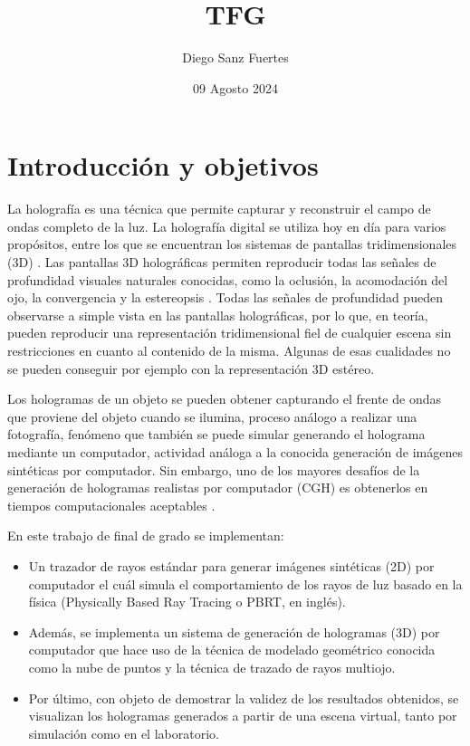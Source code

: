 \documentclass[10pt, a4paper]{article}
\title{TFG}
\author{Diego Sanz Fuertes}
\date{09 Agosto 2024}
\begin{document}
\maketitle
\titlepage
\tableofcontents
\newpage

\section{Introducción y objetivos}

La holografía es una técnica que permite capturar y reconstruir el campo de ondas completo de la luz. \cite{Goodman:2017} La holografía digital se utiliza hoy en día para varios propósitos, entre los que se encuentran los sistemas de pantallas tridimensionales (3D) \cite{Blinder:2019}. Las pantallas 3D holográficas permiten reproducir todas las señales de profundidad visuales naturales conocidas, como la oclusión, la acomodación del ojo, la convergencia y la estereopsis \cite{Blinder:2022}. Todas las señales de profundidad pueden observarse a simple vista en las pantallas holográficas, por lo que, en teoría, pueden reproducir una representación tridimensional fiel de cualquier escena sin restricciones en cuanto al contenido de la misma. Algunas de esas cualidades no se pueden conseguir por ejemplo con la representación 3D estéreo.

Los hologramas de un objeto se pueden obtener capturando el frente de ondas que proviene del objeto cuando se ilumina, proceso análogo a realizar una fotografía, fenómeno que también se puede simular generando el holograma mediante un computador, actividad análoga a la conocida generación de imágenes sintéticas por computador. Sin embargo, uno de los mayores desafíos de la generación de hologramas realistas por computador (CGH) es obtenerlos en tiempos computacionales aceptables \cite{Blinder:2019}.

En este trabajo de final de grado se implementan:
\begin{itemize}
    \item Un trazador de rayos estándar para generar imágenes sintéticas (2D) por computador el cuál simula el comportamiento de los rayos de luz basado en la física (Physically Based Ray Tracing o PBRT, en inglés).

    \item Además, se implementa un sistema de generación de hologramas (3D) por computador que hace uso de la técnica de modelado geométrico conocida como la nube de puntos y la técnica de trazado de rayos multiojo.

    \item Por último, con objeto de demostrar la validez de los resultados obtenidos, se visualizan los hologramas generados a partir de una escena virtual, tanto por simulación como en el laboratorio.

\end{itemize}
\end{document}
